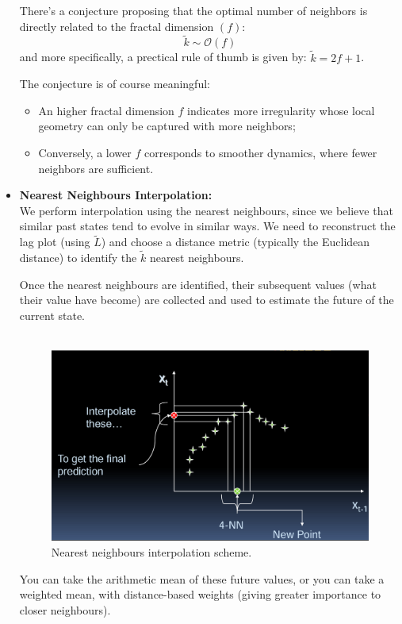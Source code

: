\begin{itemize}
    
    There's a conjecture proposing that the optimal number of neighbors is directly related to the fractal dimension $(f)$:
    \begin{equation*}
        \tilde{k} \sim  \mathcal{O}(f)
    \end{equation*}
    and more specifically, a prectical rule of thumb is given by: $\tilde{k}=2f+1$.


    The conjecture is of course meaningful:
    \begin{itemize}
        \item An higher fractal dimension $f$ indicates more irregularity whose local geometry  can only be captured with more neighbors;
        \item Conversely, a lower $f$ corresponds to smoother dynamics, where fewer neighbors are sufficient.
    \end{itemize}
    \item \textbf{Nearest Neighbours Interpolation:}\\
    We perform interpolation using the nearest neighbours, since we believe that similar past states tend to evolve in similar ways. 
    We need to reconstruct the lag plot (using $\tilde{L}$) and choose a distance metric (typically the Euclidean distance) to identify the $\tilde{k}$ nearest neighbours.

    Once the nearest neighbours are identified, their subsequent values (what their value have become) are collected and used to estimate the future of the current state.\\
    \\
\begin{figure} [H]
    \centering
    \includegraphics[width=0.75\linewidth]{img/interpolation.png}
    \caption{Nearest neighbours interpolation scheme.}
\end{figure}
    You can take the arithmetic mean of these future values, or you can take a weighted mean, with distance-based weights (giving greater importance to closer neighbours).
\end{itemize}

